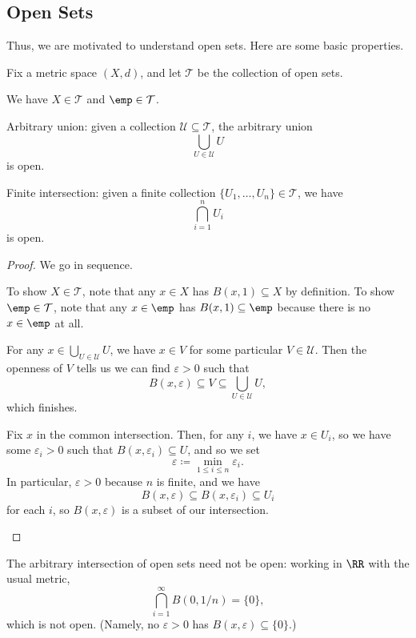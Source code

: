 \documentclass[../notes.tex]{subfiles}
\begin{document}
\subsection{Open Sets}
Thus, we are motivated to understand open sets. Here are some basic properties.
\begin{proposition} \label{prop:topodef}
	Fix a metric space $(X,d)$, and let $\mathcal T$ be the collection of open sets.
	\begin{listalph}
		\item We have $X\in\mathcal T$ and $\emp\in\mathcal T$.
		\item Arbitrary union: given a collection $\mathcal U\subseteq\mathcal T$, the arbitrary union
		\[\bigcup_{U\in\mathcal U}U\]
		is open.
		\item Finite intersection: given a finite collection $\{U_1,\ldots,U_n\}\in\mathcal T$, we have
		\[\bigcap_{i=1}^nU_i\]
		is open.
	\end{listalph}
\end{proposition}
\begin{proof}
	We go in sequence.
	\begin{listalph}
		\item To show $X\in\mathcal T$, note that any $x\in X$ has $B(x,1)\subseteq X$ by definition. To show $\emp\in\mathcal T$, note that any $x\in\emp$ has $B(x,1)\subseteq\emp$ because there is no $x\in\emp$ at all.
		\item For any $x\in\bigcup_{U\in\mathcal U}U$, we have $x\in V$ for some particular $V\in\mathcal U$. Then the openness of $V$ tells us we can find $\varepsilon>0$ such that
		\[B(x,\varepsilon)\subseteq V\subseteq\bigcup_{U\in\mathcal U}U,\]
		which finishes.
		\item Fix $x$ in the common intersection. Then, for any $i$, we have $x\in U_i$, so we have some $\varepsilon_i>0$ such that $B(x,\varepsilon_i)\subseteq U$, and so we set
		\[\varepsilon\coloneqq\min_{1\le i\le n}\varepsilon_i.\]
		In particular, $\varepsilon>0$ because $n$ is finite, and we have
		\[B(x,\varepsilon)\subseteq B(x,\varepsilon_i)\subseteq U_i\]
		for each $i$, so $B(x,\varepsilon)$ is a subset of our intersection.
		\qedhere
	\end{listalph}
\end{proof}
\begin{remark}
	The arbitrary intersection of open sets need not be open: working in $\RR$ with the usual metric,
	\[\bigcap_{i=1}^\infty B(0,1/n)=\{0\},\]
	which is not open. (Namely, no $\varepsilon>0$ has $B(x,\varepsilon)\subseteq\{0\}$.)
\end{remark}
\end{document}
